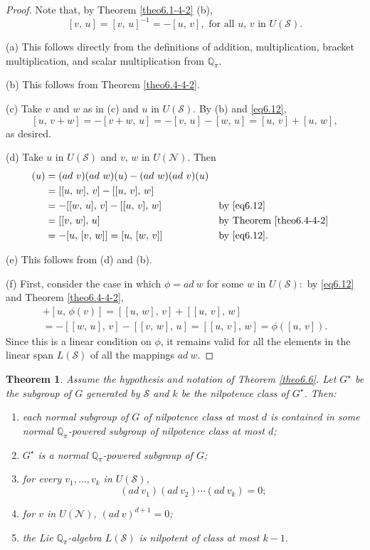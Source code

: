 \documentclass[mathscr]{amsart}
\theoremstyle{theorem}
\newtheorem{theorem}{Theorem}[section]
\theoremstyle{definition}
\numberwithin{equation}{section}
\def\Q{\mathbb{Q}}
\def\S{\mathcal{S}}
\begin{document}
\begin{proof}
Note that, by Theorem \ref{theo6.1-4-2} (b),
\begin{equation}\label{eq6.12}
[v,\,u]=[v,\,u]^{-1}=-[u,\,v],\text{ for all }u,\,v\text{ in }
U(\S).
\end{equation}

(a) This follows directly from the definitions of addition,
multiplication, bracket multiplication, and scalar multiplication
from $\Q_\pi.$

(b) This follows from Theorem \ref{theo6.4-4-2}.

(c) Take $v$ and $w$ as in (c) and $u$ in $U(\S)$. By (b) and
\eqref{eq6.12},
$$[u,\,v+w]=-[v+w,\,u]=-[v,\,u]-[w,\,u]=[u,\,v]+[u,\,w],$$
as desired.

(d) Take $u$ in $U(\S)$ and $v,\,w$ in $U(\mathcal{N})$. Then
\begin{align*}[ad\ v,\,ad\
w](u)&=(ad\ v)(ad\ w)(u)-(ad\ w)(ad\ v)(u)\\
&= [[u,\,w],\,v]- [[u,\,v],\,w]\\&=-[[w,\,u],\,v]-
[[u,\,v],\,w]&&\text{by \eqref{eq6.12}}\\
&=[[v,\,w],\,u]&&\text{by Theorem \ref{theo6.4-4-2}}\\
&=-[u,\,[v,\,w]]=[u,\,[w,\,v]]&&\text{by \eqref{eq6.12}}.\\
\end{align*}

(e) This follows from (d) and (b).

(f) First, consider the case in which $\phi=ad\ w$ for some $w$ in
$U(\S):$ by \eqref{eq6.12} and Theorem \ref{theo6.4-4-2},
\begin{multline*}
[\phi(u),\,v]+[u,\,\phi(v)]=[[u,\,w],\,v]+[[u,\,v],\,w]\\
=-[[w,\,u],\,v]-[[v,\,w],\,u]=[[u,\,v],\,w]=\phi([u,\,v]).
\end{multline*}
Since this is a linear condition on $\phi$, it remains valid for all
the elements in the linear span $L(\S)$ of all the mappings $ad\ w.$
\end{proof}

\begin{theorem}\label{theo6.7}
Assume the hypothesis and notation of Theorem \ref{theo6.6}. Let
$G^\star$ be the subgroup of $G$ generated by $\S$ and $k$ be the
nilpotence class of $G^\star$. Then:
\begin{enumerate}
\item[(a)] each normal subgroup of $G$ of nilpotence class at most
$d$ is contained in some normal $\Q_\pi$-powered subgroup of
nilpotence class at most $d$;
\item[(b)] $G^\star$ is a normal $\Q_\pi$-powered subgroup of $G$;
\item[(c)] for every $v_1,\dots, v_k$ in $U(\S)$,
$$(ad\ v_1)(ad\ v_2)\cdots(ad\ v_k)=0;$$
\item[(d)] for $v$ in $U(\mathcal{N})$, $(ad\ v)^{d+1}=0$;
\item[(e)] the Lie $\Q_\pi$-algebra $L(\S)$ is nilpotent of class at
most $k-1.$
\end{enumerate}
\end{theorem}
\end{document}
